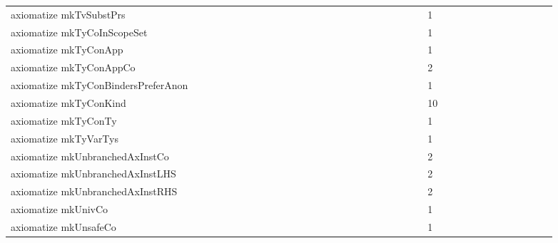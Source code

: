 {\begin{tabular}{l|rrr|rrr|rrr}
axiomatize mkTvSubstPrs &  &  &  &  &  &  &  &  &  &  &  &  &  &  &  &  &  &  &  &  &  &  &  & 1 &  &  &  &  &  &  &  &  &  &  &  & \\
axiomatize mkTyCoInScopeSet &  &  &  &  &  &  &  &  &  &  &  &  &  &  &  &  &  &  &  &  &  &  &  & 1 &  &  &  &  &  &  &  &  &  &  &  & \\
axiomatize mkTyConApp &  &  &  &  &  &  &  &  &  &  &  &  &  &  &  &  &  &  &  &  &  &  &  & 1 &  &  &  &  &  &  &  &  &  &  &  & \\
axiomatize mkTyConAppCo &  &  &  &  &  &  &  &  &  &  &  &  &  &  &  &  &  &  &  &  &  &  &  & 2 &  &  &  &  &  &  &  &  &  &  &  & \\
axiomatize mkTyConBindersPreferAnon &  &  &  &  &  &  &  &  &  &  &  &  &  &  &  &  &  &  &  &  &  &  &  & 1 &  &  &  &  &  &  &  &  &  &  &  & \\
axiomatize mkTyConKind &  &  &  &  &  &  &  &  &  &  &  &  &  &  &  &  &  &  &  &  &  &  &  & 10 &  &  &  &  &  &  &  &  &  &  &  & \\
axiomatize mkTyConTy &  &  &  &  &  &  &  &  &  &  &  &  &  &  &  &  &  &  &  &  &  &  &  & 1 &  &  &  &  &  &  &  &  &  &  &  & \\
axiomatize mkTyVarTys &  &  &  &  &  &  &  &  &  &  &  &  &  &  &  &  &  &  &  &  &  &  &  & 1 &  &  &  &  &  &  &  &  &  &  &  & \\
axiomatize mkUnbranchedAxInstCo &  &  &  &  &  &  &  &  &  &  &  &  &  &  &  &  &  &  &  &  &  &  &  & 2 &  &  &  &  &  &  &  &  &  &  &  & \\
axiomatize mkUnbranchedAxInstLHS &  &  &  &  &  &  &  &  &  &  &  &  &  &  &  &  &  &  &  &  &  &  &  & 2 &  &  &  &  &  &  &  &  &  &  &  & \\
axiomatize mkUnbranchedAxInstRHS &  &  &  &  &  &  &  &  &  &  &  &  &  &  &  &  &  &  &  &  &  &  &  & 2 &  &  &  &  &  &  &  &  &  &  &  & \\
axiomatize mkUnivCo &  &  &  &  &  &  &  &  &  &  &  &  &  &  &  &  &  &  &  &  &  &  &  & 1 &  &  &  &  &  &  &  &  &  &  &  & \\
axiomatize mkUnsafeCo &  &  &  &  &  &  &  &  &  &  &  &  &  &  &  &  &  &  &  &  &  &  &  & 1 &  &  &  &  &  &  &  &  &  &  &  & \\

\end{tabular}}
